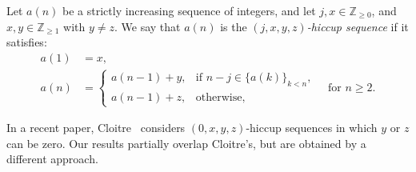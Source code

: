 \documentclass[12pt,reqno]{article}
\begin{document}
\begin{definition}
Let \( a(n) \) be a strictly increasing sequence of integers, and let \( j, x \in \mathbb{Z}_{\geq 0} \),
and \( x, y \in \mathbb{Z}_{\geq 1} \) with $y\not=z$.  
We say that \( a(n) \) is the \emph{\((j, x, y, z)\)-hiccup sequence} if it satisfies:
\begin{align*}
a(1) &= x, \\
a(n) &= 
\begin{cases}
a(n - 1) + y, & \text{if } n - j \in \{a(k)\}_{k < n}, \\[4pt]
a(n - 1) + z, & \text{otherwise},
\end{cases}
\quad \text{for } n \geq 2.
\end{align*}
\end{definition} 
In a recent paper, Cloitre~\cite{cloitre2025} considers $(0,x,y,z)$-hiccup sequences
in which $y$ or $z$ can be zero. Our results partially overlap Cloitre's, 
but are obtained by a different approach.
\end{document}
